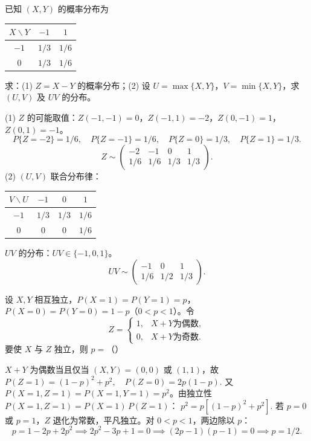 \documentclass[lang=cn,11pt]{elegantbook}
\begin{document}
\begin{exercise}[离散型函数的分布] \label{exer:3-c9}
已知 $(X,Y)$ 的概率分布为
\begin{center}
\begin{tabular}{c|cc}
\toprule
$X \backslash Y$ & $-1$ & $1$ \\
\midrule
$-1$ & $1/3$ & $1/6$ \\
$0$ & $1/3$ & $1/6$ \\
\bottomrule
\end{tabular}
\end{center}
求：(1) $Z = X - Y$ 的概率分布；(2) 设 $U = \max\{X,Y\}$，$V = \min\{X,Y\}$，求 $(U,V)$ 及 $UV$ 的分布。
\end{exercise}
\begin{solution}
(1) $Z$ 的可能取值：$Z(-1,-1)=0$，$Z(-1,1)=-2$，$Z(0,-1)=1$，$Z(0,1)=-1$。
\[
P\{Z=-2\} = 1/6,\quad P\{Z=-1\} = 1/6,\quad P\{Z=0\} = 1/3,\quad P\{Z=1\} = 1/3.
\]
\[
Z \sim \begin{pmatrix} -2 & -1 & 0 & 1 \\ 1/6 & 1/6 & 1/3 & 1/3 \end{pmatrix}.
\]
(2) $(U,V)$ 联合分布律：
\begin{center}
\begin{tabular}{c|ccc}
\toprule
$V \backslash U$ & $-1$ & $0$ & $1$ \\
\midrule
$-1$ & $1/3$ & $1/3$ & $1/6$ \\
$0$ & $0$ & $0$ & $1/6$ \\
\bottomrule
\end{tabular}
\end{center}
$UV$ 的分布：$UV \in \{-1, 0, 1\}$。
\[
UV \sim \begin{pmatrix} -1 & 0 & 1 \\ 1/6 & 1/2 & 1/3 \end{pmatrix}.
\]
\end{solution}


\begin{exercise}[独立性条件求参数] \label{exer:3-d2}
设 $X,Y$ 相互独立，$P(X=1)=P(Y=1)=p$，$P(X=0)=P(Y=0)=1-p$（$0<p<1$）。令
\[
Z = \begin{cases} 1, & X+Y \text{为偶数}, \\ 0, & X+Y \text{为奇数}. \end{cases}
\]
要使 $X$ 与 $Z$ 独立，则 $p = $（\quad）
\end{exercise}
\begin{solution}
$X+Y$ 为偶数当且仅当 $(X,Y) = (0,0)$ 或 $(1,1)$，故
\(
P(Z=1) = (1-p)^2+p^2,\quad P(Z=0) = 2p(1-p).
\)
又 $P(X=1,Z=1) = P(X=1,Y=1) = p^2$。由独立性 $P(X=1,Z=1) = P(X=1)\,P(Z=1)$：
\(
p^2 = p\left[(1-p)^2+p^2\right].
\)
若 $p=0$ 或 $p=1$，$Z$ 退化为常数，平凡独立。对 $0<p<1$，两边除以 $p$：
\[
p = 1-2p+2p^2 \implies 2p^2-3p+1 = 0 \implies (2p-1)(p-1) = 0 \implies p = 1/2.
\]
\end{solution}
\end{document}

